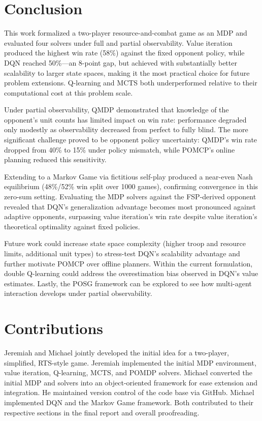 \documentclass[conference]{IEEEtran}
\begin{document}
\section{Conclusion}

This work formalized a two-player resource-and-combat game as an MDP and
evaluated four solvers under full and partial observability. Value iteration
produced the highest win rate (58\%) against the fixed opponent policy, while
DQN reached 50\%---an 8-point gap, but achieved with substantially better
scalability to larger state spaces, making it the most practical choice for
future problem extensions. Q-learning and MCTS both underperformed relative to
their computational cost at this problem scale.

Under partial observability, QMDP demonstrated that knowledge of the opponent's
unit counts has limited impact on win rate: performance degraded only modestly
as observability decreased from perfect to fully blind. The more significant
challenge proved to be opponent policy uncertainty: QMDP's win rate dropped from
40\% to 15\% under policy mismatch, while POMCP's online planning reduced this
sensitivity.

Extending to a Markov Game via fictitious self-play produced a near-even Nash equilibrium (48\%/52\% win split over 1000 games), confirming convergence in this zero-sum setting. Evaluating the MDP solvers against the FSP-derived opponent revealed that DQN's generalization advantage becomes most pronounced against adaptive opponents, surpassing value iteration's win rate despite value iteration's theoretical optimality against fixed policies.

Future work could increase state space complexity (higher troop and resource
limits, additional unit types) to stress-test DQN's scalability advantage and
further motivate POMCP over offline planners. Within the current formulation,
double Q-learning could address the overestimation bias observed in DQN's value
estimates. Lastly, the POSG framework can be explored to see how multi-agent interaction develops under partial observability.

\section*{Contributions}
Jeremiah and Michael jointly developed the initial idea for a two-player, simplified, RTS-style game. Jeremiah implemented the initial MDP environment, value iteration, Q-learning, MCTS, and POMDP solvers. Michael converted the initial MDP and solvers into an object-oriented framework for ease extension and integration. He maintained version control of the code base via GitHub. Michael implemented DQN and the Markov Game framework. Both contributed to their respective sections in the final report and overall proofreading. 
\end{document}
